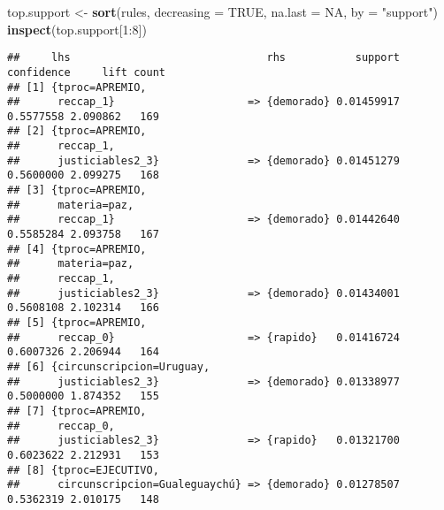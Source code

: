 \documentclass[runningheads,a4paper]{llncs}
\newenvironment{Shaded}{\footnotesize}{}
\newcommand{\KeywordTok}[1]{\textcolor[rgb]{0.00,0.44,0.13}{\textbf{{#1}}}}
\newcommand{\DataTypeTok}[1]{\textcolor[rgb]{0.56,0.13,0.00}{{#1}}}
\newcommand{\DecValTok}[1]{\textcolor[rgb]{0.25,0.63,0.44}{{#1}}}
\newcommand{\StringTok}[1]{\textcolor[rgb]{0.25,0.44,0.63}{{#1}}}
\newcommand{\OtherTok}[1]{\textcolor[rgb]{0.00,0.44,0.13}{{#1}}}
\newcommand{\NormalTok}[1]{{#1}}
\newcommand{\OperatorTok}[1]{\textcolor[rgb]{0.40,0.40,0.40}{{#1}}}
\begin{document}
\normalsize

\scriptsize

\begin{Shaded}
\begin{Highlighting}[]
\NormalTok{top.support <-}\StringTok{ }\KeywordTok{sort}\NormalTok{(rules, }\DataTypeTok{decreasing =} \OtherTok{TRUE}\NormalTok{, }
                    \DataTypeTok{na.last =} \OtherTok{NA}\NormalTok{, }\DataTypeTok{by =} \StringTok{"support"}\NormalTok{)}
\KeywordTok{inspect}\NormalTok{(top.support[}\DecValTok{1}\OperatorTok{:}\DecValTok{8}\NormalTok{])}
\end{Highlighting}
\end{Shaded}

\begin{verbatim}
##     lhs                               rhs           support confidence     lift count
## [1] {tproc=APREMIO,                                                                  
##      reccap_1}                     => {demorado} 0.01459917  0.5577558 2.090862   169
## [2] {tproc=APREMIO,                                                                  
##      reccap_1,                                                                       
##      justiciables2_3}              => {demorado} 0.01451279  0.5600000 2.099275   168
## [3] {tproc=APREMIO,                                                                  
##      materia=paz,                                                                    
##      reccap_1}                     => {demorado} 0.01442640  0.5585284 2.093758   167
## [4] {tproc=APREMIO,                                                                  
##      materia=paz,                                                                    
##      reccap_1,                                                                       
##      justiciables2_3}              => {demorado} 0.01434001  0.5608108 2.102314   166
## [5] {tproc=APREMIO,                                                                  
##      reccap_0}                     => {rapido}   0.01416724  0.6007326 2.206944   164
## [6] {circunscripcion=Uruguay,                                                        
##      justiciables2_3}              => {demorado} 0.01338977  0.5000000 1.874352   155
## [7] {tproc=APREMIO,                                                                  
##      reccap_0,                                                                       
##      justiciables2_3}              => {rapido}   0.01321700  0.6023622 2.212931   153
## [8] {tproc=EJECUTIVO,                                                                
##      circunscripcion=Gualeguaychú} => {demorado} 0.01278507  0.5362319 2.010175   148
\end{verbatim}
\end{document}
